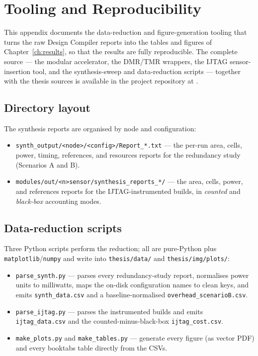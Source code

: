 \chapter{Tooling and Reproducibility}
\label{app:tools}

This appendix documents the data-reduction and figure-generation tooling that
turns the raw Design Compiler reports into the tables and figures of
Chapter~\ref{ch:results}, so that the results are fully reproducible. The
complete source --- the modular accelerator, the DMR/TMR wrappers, the IJTAG
sensor-insertion tool, and the synthesis-sweep and data-reduction scripts ---
together with the thesis sources is available in the project repository at
\href{\repourl}{\repourl}.

\section{Directory layout}

The synthesis reports are organised by node and configuration:
\begin{itemize}
  \item \texttt{synth\_output/<node>/<config>/Report\_*.txt} --- the per-run
        area, cells, power, timing, references, and resources reports for the
        redundancy study (Scenarios A and B).
  \item \texttt{modules/out/<n>sensor/synthesis\_reports\_*/} --- the area, cells,
        power, and references reports for the IJTAG-instrumented builds, in
        \emph{counted} and \emph{black-box} accounting modes.
\end{itemize}

\section{Data-reduction scripts}

Three Python scripts perform the reduction; all are pure-Python plus
\texttt{matplotlib}/\texttt{numpy} and write into \texttt{thesis/data/} and
\texttt{thesis/img/plots/}:

\begin{itemize}
  \item \texttt{parse\_synth.py} --- parses every redundancy-study report,
        normalises power units to milliwatts, maps the on-disk configuration
        names to clean keys, and emits \texttt{synth\_data.csv} and a
        baseline-normalised \texttt{overhead\_scenarioB.csv}.
  \item \texttt{parse\_ijtag.py} --- parses the instrumented builds and emits
        \texttt{ijtag\_data.csv} and the counted-minus-black-box
        \texttt{ijtag\_cost.csv}.
  \item \texttt{make\_plots.py} and \texttt{make\_tables.py} --- generate every
        figure (as vector PDF) and every booktabs table directly from the CSVs.
\end{itemize}

